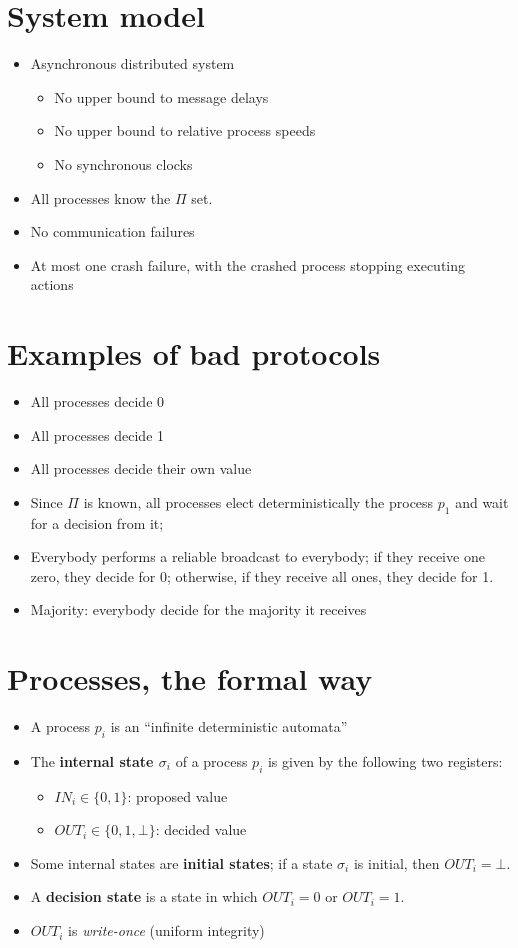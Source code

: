 \documentclass[12pt]{article}
\newcommand{\BI}{\begin{itemize}}
\newcommand{\EI}{\end{itemize}}
\newcommand{\IN}{\mathit{IN}}
\newcommand{\OUT}{\mathit{OUT}}
\begin{document}
\section*{System model}

\BI
\item Asynchronous distributed system 
  \BI
  \item No upper bound to message delays
  \item No upper bound to relative process speeds
  \item No synchronous clocks
  \EI
\item All processes know the $\Pi$ set.
\item No communication failures
\item At most one crash failure, with the crashed process
  stopping executing actions
\EI

\section*{Examples of bad protocols}

\BI
\item All processes decide 0
\item All processes decide 1
\item All processes decide their own value
\item Since $\Pi$ is known, all processes elect deterministically
  the process $p_1$ and wait for a decision from it;
\item Everybody performs a reliable broadcast to everybody; if they receive one zero,
  they decide for 0; otherwise, if they receive all ones, they decide for 1.
\item Majority: everybody decide for the majority it receives
\EI

\section*{Processes, the formal way}

\BI
\item A process $p_i$ is an ``infinite deterministic automata''
\item The {\bf internal state $\sigma_i$} of a process $p_i$ is given by
  the following two registers: 
  \BI
  \item $\IN_i \in \{ 0, 1 \}$: proposed value
  \item $\OUT_i \in \{ 0, 1, \bot \}$: decided value
  \EI
\item Some internal states are {\bf initial states}; if a state $\sigma_i$
  is initial, then $\OUT_i = \bot$.
\item A {\bf decision state} is a state in which $\OUT_i = 0$ or $\OUT_i = 1$.
\item $OUT_i$ is {\em write-once} (uniform integrity)
\EI
\end{document}
